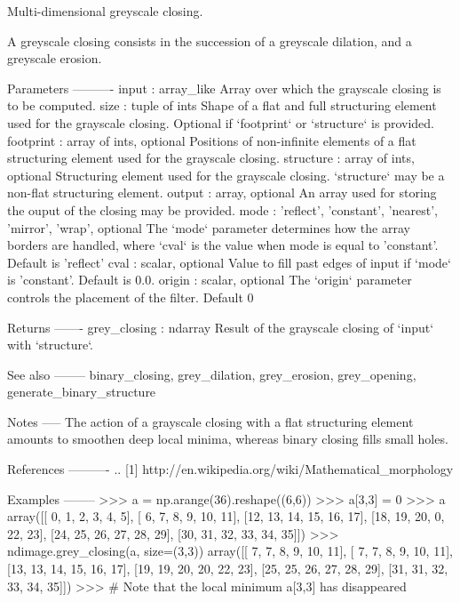 \begin{DoxyVerb}Multi-dimensional greyscale closing.

A greyscale closing consists in the succession of a greyscale dilation,
and a greyscale erosion.

Parameters
----------
input : array_like
    Array over which the grayscale closing is to be computed.
size : tuple of ints
    Shape of a flat and full structuring element used for the grayscale
    closing. Optional if `footprint` or `structure` is provided.
footprint : array of ints, optional
    Positions of non-infinite elements of a flat structuring element
    used for the grayscale closing.
structure : array of ints, optional
    Structuring element used for the grayscale closing. `structure`
    may be a non-flat structuring element.
output : array, optional
    An array used for storing the ouput of the closing may be provided.
mode : {'reflect', 'constant', 'nearest', 'mirror', 'wrap'}, optional
    The `mode` parameter determines how the array borders are
    handled, where `cval` is the value when mode is equal to
    'constant'. Default is 'reflect'
cval : scalar, optional
    Value to fill past edges of input if `mode` is 'constant'. Default
    is 0.0.
origin : scalar, optional
    The `origin` parameter controls the placement of the filter.
    Default 0

Returns
-------
grey_closing : ndarray
    Result of the grayscale closing of `input` with `structure`.

See also
--------
binary_closing, grey_dilation, grey_erosion, grey_opening,
generate_binary_structure

Notes
-----
The action of a grayscale closing with a flat structuring element amounts
to smoothen deep local minima, whereas binary closing fills small holes.

References
----------
.. [1] http://en.wikipedia.org/wiki/Mathematical_morphology

Examples
--------
>>> a = np.arange(36).reshape((6,6))
>>> a[3,3] = 0
>>> a
array([[ 0,  1,  2,  3,  4,  5],
       [ 6,  7,  8,  9, 10, 11],
       [12, 13, 14, 15, 16, 17],
       [18, 19, 20,  0, 22, 23],
       [24, 25, 26, 27, 28, 29],
       [30, 31, 32, 33, 34, 35]])
>>> ndimage.grey_closing(a, size=(3,3))
array([[ 7,  7,  8,  9, 10, 11],
       [ 7,  7,  8,  9, 10, 11],
       [13, 13, 14, 15, 16, 17],
       [19, 19, 20, 20, 22, 23],
       [25, 25, 26, 27, 28, 29],
       [31, 31, 32, 33, 34, 35]])
>>> # Note that the local minimum a[3,3] has disappeared\end{DoxyVerb}
 \hypertarget{namespacescipy_1_1ndimage_1_1morphology_a2797039bf4c5ecf1c5325486d2d2a9a3}{}
